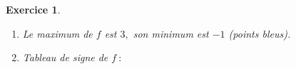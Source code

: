 \documentclass[10pt]{article}
\newtheorem{exo}{Exercice}
\begin{document}
\begin{exo}
\begin{enumerate}
\begin{center}
\end{center}
\item Le maximum de $f$ est $3,$ son minimum est $-1$ (points bleus).


\item Tableau de signe de $f~:$

\begin{center}
\end{center}

\end{enumerate}

\end{exo}
\end{document}
